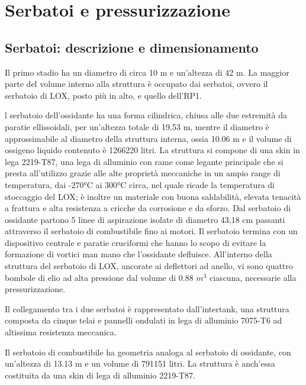 \section{Serbatoi e pressurizzazione}
\label{sec:serbatoi e pressurizzazione}

\subsection{Serbatoi: descrizione e dimensionamento}
\label{subsec:Serbatoi:descrizione_e_dimensionamento}


Il primo stadio ha un diametro di circa 10 m e un’altezza di 42 m. La maggior parte del volume interno alla struttura è occupato dai serbatoi, ovvero il serbatoio di LOX, posto più in alto, e quello dell’RP1. 

l serbatoio dell’ossidante ha una forma cilindrica, chiusa alle due estremità da paratie ellissoidali, per un’altezza totale di 19.53 m, mentre il diametro è approssimabile al diametro della struttura interna, ossia 10.06 m e il volume di ossigeno liquido contenuto è 1266220 litri. 
La struttura si compone di una skin in lega 2219-T87, una lega di alluminio con rame come legante principale che si presta all’utilizzo grazie alle alte proprietà meccaniche in un ampio range di temperatura, dai -270°C ai 300°C circa, nel quale ricade la temperatura di stoccaggio del LOX; è inoltre un materiale con buona saldabilità, elevata tenacità a frattura e alta resistenza a cricche da corrosione e da sforzo. 
Dal serbatoio di ossidante partono 5 linee di aspirazione isolate di diametro 43,18 cm passanti attraverso il serbatoio di combustibile fino ai motori. 
Il serbatoio termina con un dispositivo centrale e paratie cruciformi che hanno lo scopo di evitare la formazione di vortici man mano che l’ossidante defluisce.
All’interno della struttura del serbatoio di LOX, ancorate ai deflettori ad anello, vi sono quattro bombole di elio ad alta pressione dal volume di 0.88 $m^3$ ciascuna, necessarie alla pressurizzazione.

Il collegamento tra i due serbatoi è rappresentato dall’intertank, una struttura composta da cinque telai e pannelli ondulati in lega di alluminio 7075-T6 ad altissima resistenza meccanica.

Il serbatoio di combustibile ha geometria analoga al serbatoio di ossidante, con un’altezza di 13.13 m e un volume di 791151 litri. La struttura è anch’essa costituita da una skin di lega di alluminio 2219-T87.

